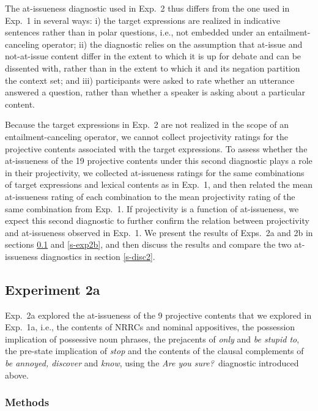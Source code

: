 \documentclass[11pt,fleqn]{article}
\newcommand{\6}{\mbox{$[\hspace*{-.6mm}[$}}
\newcommand{\9}{\mbox{$]\hspace*{-.6mm}]$}}
\begin{document}
The at-issueness diagnostic used in Exp.~2 thus differs from the one used in Exp.~1 in several ways: i) the target expressions are realized in indicative sentences rather than in polar questions, i.e., not embedded under an entailment-canceling operator; ii) the diagnostic relies on the assumption that at-issue and not-at-issue content differ in the extent to which it is up for debate and can be dissented with, rather than in the extent to which it and its negation partition the context set; and iii) participants were asked to rate whether an utterance answered a question, rather than whether a speaker is asking about a particular content.

Because the target expressions in Exp.~2 are not realized in the scope of an entailment-canceling operator, we cannot collect projectivity ratings for the projective contents associated with the target expressions. To assess whether the at-issueness of the 19 projective contents under this second diagnostic plays a role in their projectivity, we collected at-issueness ratings for the same combinations of target expressions and lexical contents as in Exp.~1, and then related the mean at-issueness rating of each combination to the mean projectivity rating of the same combination from Exp.~1. If projectivity is a function of at-issueness, we expect this second diagnostic to further confirm the relation between projectivity and at-issueness observed in Exp.~1. We present the results of Exps.~2a and 2b in sections \ref{s-exp2a} and \ref{s-exp2b}, and then discuss the results and compare the two at-issueness diagnostics in section \ref{s-disc2}.

\subsection{Experiment 2a}\label{s-exp2a}

Exp.~2a explored the at-issueness of the 9 projective contents that we explored in Exp.~1a, i.e., the contents of NRRCs and nominal appositives, the possession implication of possessive noun phrases, the prejacents of {\em only} and {\em be stupid to}, the pre-state implication of {\em stop} and the contents of the clausal complements of {\em be annoyed, discover} and {\em know}, using the {\em Are you sure?}~diagnostic introduced above.

\subsubsection{Methods}\label{s-methods-2a}
\end{document}
